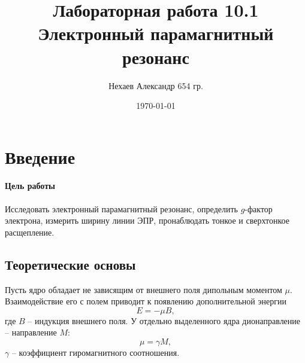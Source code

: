 \documentclass[a4paper, 12pt]{article}
\begin{document}
	\title{Лабораторная работа 10.1\\Электронный парамагнитный резонанс}
	\author{Нехаев Александр 654 гр.}
	\date{\today}
	\maketitle
	\tableofcontents
	\section{Введение}
	\paragraph{Цель работы} Исследовать электронный парамагнитный резонанс, определить $g$-фактор электрона, измерить ширину линии ЭПР, пронаблюдать тонкое и сверхтонкое расщепление.
	\subsection{Теоретические основы}
	Пусть ядро обладает не зависящим от внешнего поля дипольным моментом $\mu$. Взаимодействие его с полем приводит к появлению дополнительной энергии
	\begin{equation}
		E=-\mu B,
		\label{e.eq}
	\end{equation}
	где $B$ -- индукция внешнего поля. У отдельно выделенного ядра дионаправление -- направление $M$:
	\begin{equation}
		\mu=\gamma M,
		\label{mu.eq}
	\end{equation}
	$\gamma$ -- коэффициент гиромагнитного соотношения.
\end{document}
